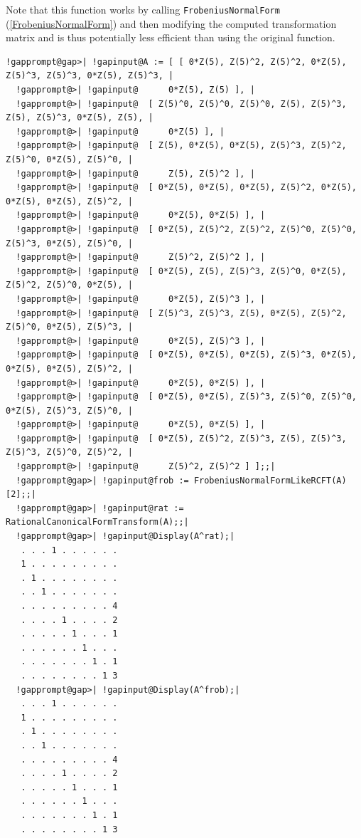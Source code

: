 \documentclass[a4paper,11pt]{report}
\begin{document}
{{{ Note that this function works by calling \texttt{FrobeniusNormalForm} (\ref{FrobeniusNormalForm}) and then modifying the computed transformation matrix and is thus potentially
less efficient than using the original function. 
\begin{Verbatim}[commandchars=!@|,fontsize=\small,frame=single,label=Example]
  !gapprompt@gap>| !gapinput@A := [ [ 0*Z(5), Z(5)^2, Z(5)^2, 0*Z(5), Z(5)^3, Z(5)^3, 0*Z(5), Z(5)^3, |
  !gapprompt@>| !gapinput@      0*Z(5), Z(5) ], |
  !gapprompt@>| !gapinput@  [ Z(5)^0, Z(5)^0, Z(5)^0, Z(5), Z(5)^3, Z(5), Z(5)^3, 0*Z(5), Z(5), |
  !gapprompt@>| !gapinput@      0*Z(5) ], |
  !gapprompt@>| !gapinput@  [ Z(5), 0*Z(5), 0*Z(5), Z(5)^3, Z(5)^2, Z(5)^0, 0*Z(5), Z(5)^0, |
  !gapprompt@>| !gapinput@      Z(5), Z(5)^2 ], |
  !gapprompt@>| !gapinput@  [ 0*Z(5), 0*Z(5), 0*Z(5), Z(5)^2, 0*Z(5), 0*Z(5), 0*Z(5), Z(5)^2, |
  !gapprompt@>| !gapinput@      0*Z(5), 0*Z(5) ], |
  !gapprompt@>| !gapinput@  [ 0*Z(5), Z(5)^2, Z(5)^2, Z(5)^0, Z(5)^0, Z(5)^3, 0*Z(5), Z(5)^0, |
  !gapprompt@>| !gapinput@      Z(5)^2, Z(5)^2 ], |
  !gapprompt@>| !gapinput@  [ 0*Z(5), Z(5), Z(5)^3, Z(5)^0, 0*Z(5), Z(5)^2, Z(5)^0, 0*Z(5), |
  !gapprompt@>| !gapinput@      0*Z(5), Z(5)^3 ], |
  !gapprompt@>| !gapinput@  [ Z(5)^3, Z(5)^3, Z(5), 0*Z(5), Z(5)^2, Z(5)^0, 0*Z(5), Z(5)^3, |
  !gapprompt@>| !gapinput@      0*Z(5), Z(5)^3 ], |
  !gapprompt@>| !gapinput@  [ 0*Z(5), 0*Z(5), 0*Z(5), Z(5)^3, 0*Z(5), 0*Z(5), 0*Z(5), Z(5)^2, |
  !gapprompt@>| !gapinput@      0*Z(5), 0*Z(5) ], |
  !gapprompt@>| !gapinput@  [ 0*Z(5), 0*Z(5), Z(5)^3, Z(5)^0, Z(5)^0, 0*Z(5), Z(5)^3, Z(5)^0, |
  !gapprompt@>| !gapinput@      0*Z(5), 0*Z(5) ], |
  !gapprompt@>| !gapinput@  [ 0*Z(5), Z(5)^2, Z(5)^3, Z(5), Z(5)^3, Z(5)^3, Z(5)^0, Z(5)^2, |
  !gapprompt@>| !gapinput@      Z(5)^2, Z(5)^2 ] ];;|
  !gapprompt@gap>| !gapinput@frob := FrobeniusNormalFormLikeRCFT(A)[2];;|
  !gapprompt@gap>| !gapinput@rat := RationalCanonicalFormTransform(A);;|
  !gapprompt@gap>| !gapinput@Display(A^rat);|
   . . . 1 . . . . . .
   1 . . . . . . . . .
   . 1 . . . . . . . .
   . . 1 . . . . . . .
   . . . . . . . . . 4
   . . . . 1 . . . . 2
   . . . . . 1 . . . 1
   . . . . . . 1 . . .
   . . . . . . . 1 . 1
   . . . . . . . . 1 3
  !gapprompt@gap>| !gapinput@Display(A^frob);|
   . . . 1 . . . . . .
   1 . . . . . . . . .
   . 1 . . . . . . . .
   . . 1 . . . . . . .
   . . . . . . . . . 4
   . . . . 1 . . . . 2
   . . . . . 1 . . . 1
   . . . . . . 1 . . .
   . . . . . . . 1 . 1
   . . . . . . . . 1 3
\end{Verbatim}
 }

}}
\end{document}
